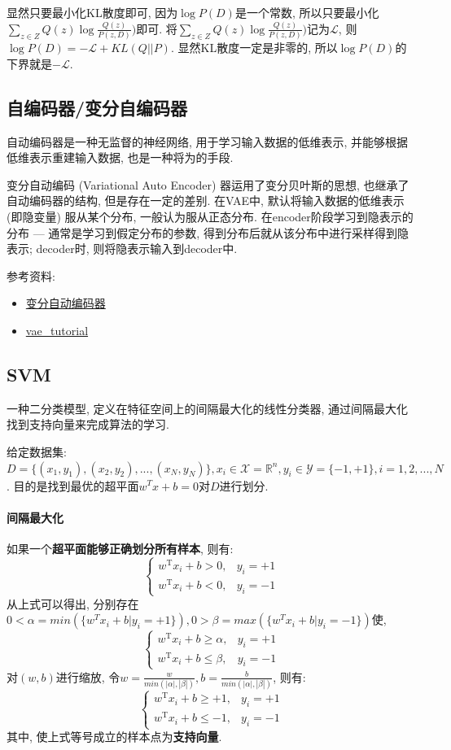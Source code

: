 显然只要最小化KL散度即可, 因为$\log P(D)$是一个常数, 所以只要最小化$\sum_{z \in Z} Q(z) \log \frac{Q(z)}{P(z, D)})$即可. 将$\sum_{z \in Z} Q(z) \log \frac{Q(z)}{P(z, D)})$记为$\mathcal{L}$, 则$\log P(D) = -\mathcal{L} + KL(Q || P)$. 显然KL散度一定是非零的, 所以$\log P(D)$的下界就是$-\mathcal{L}$. 


\subsection{自编码器/变分自编码器}
自动编码器是一种无监督的神经网络, 用于学习输入数据的低维表示, 并能够根据低维表示重建输入数据, 也是一种将为的手段. 

变分自动编码 (Variational Auto Encoder) 器运用了变分贝叶斯的思想, 也继承了自动编码器的结构, 但是存在一定的差别. 在VAE中, 默认将输入数据的低维表示 (即隐变量) 服从某个分布, 一般认为服从正态分布. 在encoder阶段学习到隐表示的分布 --- 通常是学习到假定分布的参数, 得到分布后就从该分布中进行采样得到隐表示; decoder时, 则将隐表示输入到decoder中. 

参考资料: 
\begin{itemize}
	\item \href{https://www.cnblogs.com/kexinxin/p/9858525.html}{变分自动编码器}
	\item \href{https://github.com/cdoersch/vae_tutorial}{vae\_tutorial}
\end{itemize}

\subsection{SVM}
一种二分类模型, 定义在特征空间上的间隔最大化的线性分类器, 通过间隔最大化找到支持向量来完成算法的学习. 

给定数据集: $D = \{(x_1, y_1), (x_2, y_2), ..., (x_N, y_N)\}, x_i \in \mathcal{X} = \mathbb{R}^n, y_i \in \mathcal{Y} = \{-1, +1\}, i = 1, 2, ..., N$. 目的是找到最优的超平面$w^T x + b = 0$对$D$进行划分. 

\paragraph{间隔最大化}如果一个\textbf{超平面能够正确划分所有样本}, 则有: 
$$
\begin{cases}
	{w}^{\mathrm{T}} {x}_{i}+b > 0, & y_{i}=+1 \\ 
	{w}^{\mathrm{T}} {x}_{i}+b < 0, & y_{i}=-1
\end{cases}
$$ 
从上式可以得出, 分别存在$0 < \alpha = min(\{w^T x_i + b | y_i = +1\}), 0 > \beta = max(\{w^T x_i + b | y_i = -1\})$使, 
$$
\begin{cases}
	{w}^{\mathrm{T}} {x}_{i}+b \geqslant \alpha, & y_{i}=+1 \\ 
	{w}^{\mathrm{T}} {x}_{i}+b \leqslant \beta, & y_{i}=-1
\end{cases}
$$
对$(w, b)$进行缩放, 令$w = \frac{w}{min(|\alpha|, |\beta|)}, b = \frac{b}{min(|\alpha|, |\beta|)} $, 则有: 
$$
\begin{cases}
	{w}^{\mathrm{T}} {x}_{i}+b \geqslant +1, & y_{i}=+1 \\ 
	{w}^{\mathrm{T}} {x}_{i}+b \leqslant -1, & y_{i}=-1
\end{cases}
$$
其中, 使上式等号成立的样本点为\textbf{支持向量}. 

